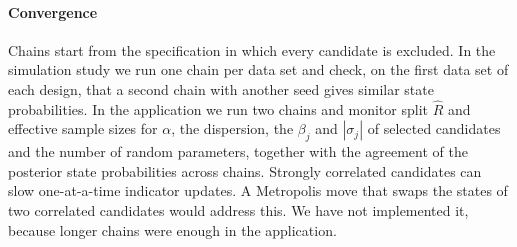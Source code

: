 \paragraph{Convergence} Chains start from the specification in which every candidate is excluded. In the simulation study we run one chain per data set and check, on the first data set of each design, that a second chain with another seed gives similar state probabilities. In the application we run two chains and monitor split $\widehat R$ and effective sample sizes \citep{vehtari2021rank} for $\alpha$, the dispersion, the $\beta_j$ and $|\sigma_j|$ of selected candidates and the number of random parameters, together with the agreement of the posterior state probabilities across chains. Strongly correlated candidates can slow one-at-a-time indicator updates. A Metropolis move that swaps the states of two correlated candidates would address this. We have not implemented it, because longer chains were enough in the application.
